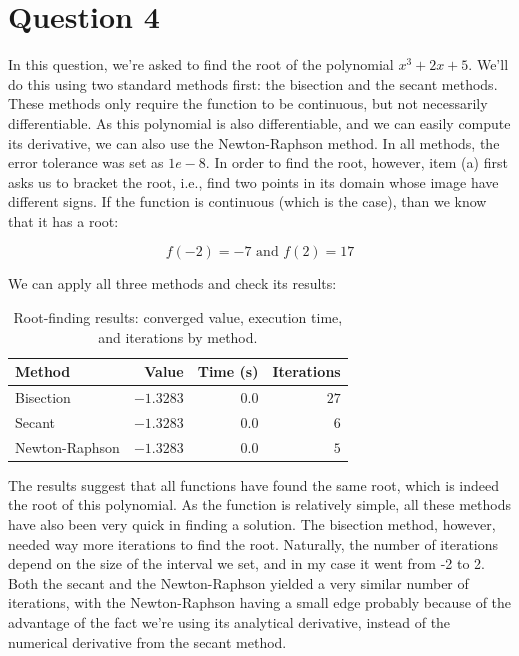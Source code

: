 \documentclass{article}
\begin{document}
\newpage

\section{Question 4}

In this question, we're asked to find the root of the polynomial $x^3+2x+5$. We'll do this using two standard methods first: the bisection and the secant methods. These methods only require the function to be continuous, but not necessarily differentiable. As this polynomial is also differentiable, and we can easily compute its derivative, we can also use the Newton-Raphson method. In all methods, the error tolerance was set as $1e-8$. In order to find the root, however, item (a) first asks us to bracket the root, i.e., find two points in its domain whose image have different signs. If the function is continuous (which is the case), than we know that it has a root:

$$
f(-2)=-7 \text{ and } f(2)=17
$$

We can apply all three methods and check its results:

\begin{table}[h!]
\centering
\begin{tabular}{lrrr}
    \toprule
    Method & Value & Time (s) & Iterations \\
    \midrule
    Bisection       & $-1.3283$ & $0.0$ & $27$ \\
    Secant          & $-1.3283$ & $0.0$ & $6$  \\
    Newton-Raphson  & $-1.3283$ & $0.0$ & $5$  \\
    \bottomrule
\end{tabular}
\caption{Root-finding results: converged value, execution time, and iterations by method.}
\label{tab:rootfinding}
\end{table}

The results suggest that all functions have found the same root, which is indeed the root of this polynomial. As the function is relatively simple, all these methods have also been very quick in finding a solution. The bisection method, however, needed way more iterations to find the root. Naturally, the number of iterations depend on the size of the interval we set, and in my case it went from -2 to 2. Both the secant and the Newton-Raphson yielded a very similar number of iterations, with the Newton-Raphson having a small edge probably because of the advantage of the fact we're using its analytical derivative, instead of the numerical derivative from the secant method.
\end{document}
